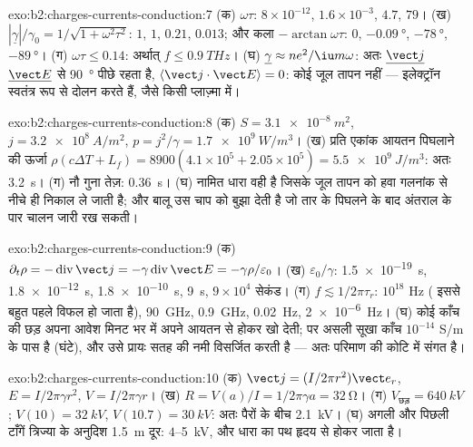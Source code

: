 \begin{solution}{exo:b2:charges-currents-conduction:7}
(क) $\omega\tau$: $8 \times 10^{-12}$, $1.6 \times 10^{-3}$, $4.7$, $79$। (ख) $|\underline\gamma|/\gamma_0 =
1/\sqrt{1 + \omega^2\tau^2}$: $1$, $1$, $0.21$, $0.013$; और कला $-\arctan\omega\tau$: $0$,
$-\qty{0.09}{\degree}$, $-\qty{78}{\degree}$, $-\qty{89}{\degree}$। (ग) $\omega\tau \le 0.14$: अर्थात् $f \le
\qty{0.9}{THz}$। (घ) $\underline\gamma \approx ne^2/\iu m\omega$: अतः $\underline{\vect j}$
$\underline{\vect E}$ से \qty{90}{\degree} पीछे रहता है, $\langle\vect j\cdot\vect E\rangle = 0$: कोई जूल
तापन नहीं --- इलेक्ट्रॉन स्वतंत्र रूप से दोलन करते हैं, जैसे किसी प्लाज़्मा में।
\end{solution}

\begin{solution}{exo:b2:charges-currents-conduction:8}
(क) $S = \qty{3.1e-8}{m^2}$, $j = \qty{3.2e8}{A/m^2}$, $p = j^2/\gamma = \qty{1.7e9}{W/m^3}$।
(ख) प्रति एकांक आयतन पिघलाने की ऊर्जा $\rho(c\Delta T + L_f) = 8900(4.1 \times 10^5 + 2.05 \times
10^5) = \qty{5.5e9}{J/m^3}$: अतः \qty{3.2}{s}। (ग) नौ गुना तेज़: \qty{0.36}{s}। (घ)
नामित धारा वही है जिसके जूल तापन को हवा गलनांक से नीचे ही
निकाल ले जाती है; और बालू उस चाप को बुझा देती है जो तार के पिघलने के बाद
अंतराल के पार चालन जारी रख सकती।
\end{solution}

\begin{solution}{exo:b2:charges-currents-conduction:9}
(क) $\partial_t\rho = -\operatorname{div}\vect j = -\gamma\operatorname{div}\vect E = -\gamma\rho/
\varepsilon_0$। (ख) $\varepsilon_0/\gamma$: \qty{1.5e-19}{s}, \qty{1.8e-12}{s}, \qty{1.8e-10}{s},
\qty{9}{s}, $9 \times 10^4$ सेकंड। (ग) $f \lesssim 1/2\pi\tau_r$: $10^{18}$ Hz (
इससे बहुत पहले विफल हो जाता है), \qty{90}{GHz}, \qty{0.9}{GHz}, \qty{0.02}{Hz}, \qty{2e-6}{Hz}। (घ)
कोई काँच की छड़ अपना आवेश मिनट भर में अपने आयतन से होकर खो देती;
पर असली सूखा काँच $10^{-14}$ S/m के पास है (घंटे), और उसे प्रायः सतह की
नमी विसर्जित करती है --- अतः परिमाण की कोटि में
संगत है।
\end{solution}

\begin{solution}{exo:b2:charges-currents-conduction:10}
(क) $\vect j = (I/2\pi r^2)\vect e_r$, $E = I/2\pi\gamma r^2$, $V = I/2\pi\gamma r$। (ख) $R = V(a)
/I = 1/2\pi\gamma a = \qty{32}{\ohm}$। (ग) $V_{\text{छड़}} = \qty{640}{kV}$; $V(10) = \qty{32}{kV}$,
$V(10.7) = \qty{30}{kV}$: अतः पैरों के बीच \qty{2.1}{kV}। (घ) अगली और पिछली
टाँगें त्रिज्या के अनुदिश \qty{1.5}{m} दूर: $4$--\qty{5}{kV}, और धारा का
पथ हृदय से होकर जाता है।
\end{solution}

